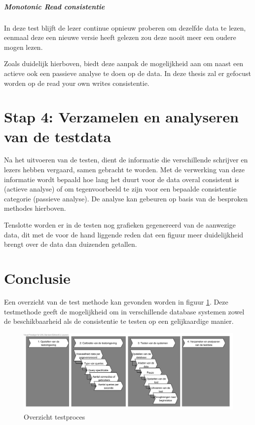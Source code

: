 \subparagraph{Monotonic Read consistentie} In deze test blijft de lezer continue opnieuw proberen om dezelfde data te lezen, eenmaal deze een nieuwe versie heeft gelezen zou deze nooit meer een oudere mogen lezen. 

Zoals duidelijk hierboven, biedt deze aanpak de mogelijkheid aan om naast een actieve ook een passieve analyse te doen op de data. In deze thesis zal er gefocust worden op de read your own writes consistentie. 

\section{Stap 4: Verzamelen en analyseren van de testdata}
Na het uitvoeren van de testen, dient de informatie die verschillende schrijver en lezers hebben vergaard, samen gebracht te worden. Met de verwerking van deze informatie wordt bepaald hoe lang het duurt voor de data overal consistent is (actieve analyse) of om  tegenvoorbeeld te zijn voor een bepaalde consistentie categorie (passieve analyse). De analyse kan gebeuren op basis van de besproken methodes hierboven. 

Tenslotte worden er in de testen nog grafieken gegenereerd van de aanwezige data, dit met de voor de hand liggende reden dat een figuur meer duidelijkheid brengt over de data dan duizenden getallen.  

\section{Conclusie}
Een overzicht van de test methode kan gevonden worden in figuur \ref{fig:test-process-detailed}. Deze testmethode geeft de mogelijkheid om in verschillende database systemen zowel de beschikbaarheid als de consistentie te testen op een gelijkaardige manier. 

\begin{figure}[htb!]
\centering
\includegraphics[width=\linewidth]{img/Test-Process-Detailed-Overview}
\caption{Overzicht testproces}
\label{fig:test-process-detailed}
\end{figure}
